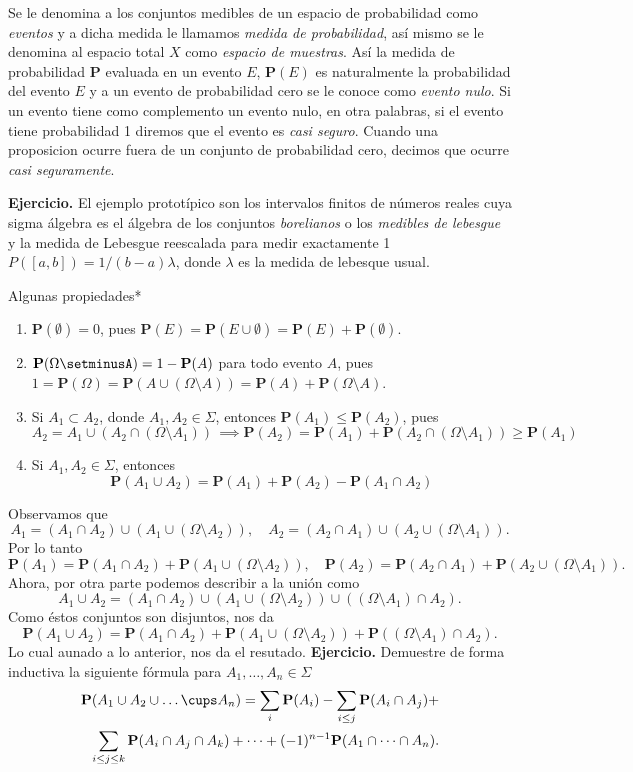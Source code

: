 \documentclass[letterpaper]{book}
\newcommand{\prob}{\textbf{P}}
\newcommand{\eje}{{\newline \noindent \sc \textbf{Ejercicio. }}}
\newcommand{\dem}{{\noindent \sc Demostraci\'on. }}
\newcommand{\om}{\ensuremath{\Omega}}
\newcommand{\sig}{\ensuremath{\Sigma}}
\begin{document}
Se le denomina a los conjuntos medibles de un espacio de probabilidad como \emph{eventos} y a dicha medida le llamamos \emph{medida de probabilidad}, así mismo se le denomina al espacio total \(X\) como \emph{espacio de muestras}. Así la medida de probabilidad \textbf{P} evaluada en un evento \(E\), \(\prob(E)\) es naturalmente la probabilidad del evento \(E\) y a un evento de probabilidad cero se le conoce como \emph{evento nulo}. Si un evento tiene como complemento un evento nulo, en otra palabras, si el evento tiene probabilidad 1 diremos que el evento es \emph{casi seguro}. Cuando una proposicion ocurre fuera de un conjunto de probabilidad cero, decimos que ocurre \emph{casi seguramente}.

\eje El ejemplo prototípico son los intervalos finitos de números reales cuya sigma álgebra es el álgebra de los conjuntos \emph{borelianos} o los \emph{medibles de lebesgue} y la medida de Lebesgue reescalada para medir exactamente 1 \(P([a,b])=1/(b-a)\lambda\), donde \(\lambda\) es la medida de lebesque usual.


\noindent \big*Algunas propiedades*

\begin{enumerate}
\item \(\prob(\emptyset)=0\), pues \(\prob(E)=\prob(E\cup\emptyset)=\prob(E)+\prob(\emptyset)\).
\item \(\prob(\om\setminusA)=1-\prob(A)\) para todo evento \(A\), pues \(1=\prob(\om)=\prob(A\cup(\om\setminus A))=\prob(A)+\prob(\om\setminus A)\).
\item Si \(A_1\subset A_2\), donde \(A_1,A_2\in\sig\), entonces \(\prob(A_1)\leq\prob(A_2)\), pues
\[
   A_2=A_1\cup(A_2\cap(\om\setminus A_1))\,\implies\prob(A_2)=\prob(A_1)+\prob(A_2\cap(\om\setminus A_1))\geq\prob(A_1)
   \]
\item Si \(A_1,A_2\in\sig\), entonces
\[
   \prob(A_1\cup A_2)=\prob(A_1)+\prob(A_2)-\prob(A_1\cap A_2)
   \]
\end{enumerate}
\noindent\dem Observamos que
\[
A_1=(A_1\cap A_2)\cup(A_1\cup(\om\setminus A_2)),\quad A_2=(A_2\cap A_1)\cup(A_2\cup(\om\setminus A_1)).
\]
Por lo tanto
\[
\prob(A_1)=\prob(A_1\cap A_2)+\prob(A_1\cup(\om\setminus A_2)),\quad \prob(A_2)=\prob(A_2\cap A_1)+\prob(A_2\cup(\om\setminus A_1)).
\]
Ahora, por otra parte podemos describir a la unión como 
\[
A_1\cup A_2=(A_1\cap A_2)\cup(A_1\cup(\om\setminus A_2))\cup((\om\setminus A_1)\cap A_2).
\]
Como éstos conjuntos son disjuntos, nos da
\[
\prob(A_1\cup A_2)=\prob(A_1\cap A_2)+\prob(A_1\cup(\om\setminus A_2))+\prob((\om\setminus A_1)\cap A_2).
\]
Lo cual aunado a lo anterior, nos da el resutado.
\eje Demuestre de forma inductiva la siguiente fórmula para \(A_1,\dots,A_n\in\sig\)
\begin{align*}
\prob(A_1\cup A_2\cup\dots\cups A_n)=\sum_{i}\prob(A_i)-\sum_{i\leq j}\prob(A_i\cap A_j)+\\
\sum_{i\leq j\leq k}\prob(A_i\cap A_j\cap A_k)+\cdots+(-1)^{n-1}\prob(A_1\cap\dots\cap A_n).
\end{align*}
\end{document}
